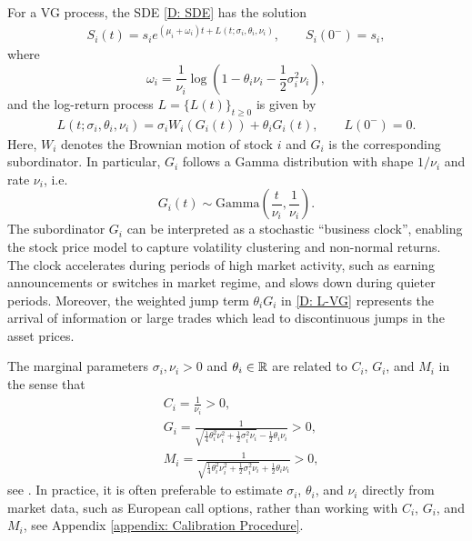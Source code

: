 For a VG process, the SDE \eqref{D: SDE} has the solution
\begin{align}
    S_i(t) = s_i e^{(\mu_i+\omega_i)t + L(t;\sigma_i, \theta_i, \nu_i)}, \qquad S_i(0^-) = s_i,
    \label{D: Stock price model}
\end{align}
where 
\begin{equation}
    \omega_i = \frac{1}{\nu_i} \log \left( 1 - \theta_i\nu_i - \frac{1}{2}\sigma_i^2 \nu_i \right),
    \label{D: omega-i}
\end{equation}
and the log-return process $L=\{L(t)\}_{t \geq 0}$ is given by
\begin{align}
    L(t;\sigma_i, \theta_i, \nu_i) = \sigma_i W_i(G_i(t)) + \theta_iG_i(t), \qquad L(0^-)=0.
    \label{D: L-VG}
\end{align}
Here, $W_i$ denotes the Brownian motion of stock $i$ and $G_i$ is the corresponding subordinator. In particular, $G_i$ follows a Gamma distribution with shape $1/\nu_i$ and rate $\nu_i$, i.e.
\begin{equation*}
    G_i(t) \sim \text{Gamma}\left(\frac{t}{\nu_i}, \frac{1}{\nu_i} \right). 
\end{equation*}
The subordinator $G_i$ can be interpreted as a stochastic ``business clock'', enabling the stock price model to capture volatility clustering and non-normal returns. The clock accelerates during periods of high market activity, such as earning announcements or switches in market regime, and slows down during quieter periods. Moreover, the weighted jump term $\theta_i G_i$ in \eqref{D: L-VG} represents the arrival of information or large trades which lead to discontinuous jumps in the asset prices.

The marginal parameters $\sigma_i, \nu_i > 0$ and $\theta_i \in \mathbb{R}$ are related to $C_i$, $G_i$, and $M_i$ in the sense that
\begin{align*}
    & C_i = \frac{1}{\nu_i} > 0, \\
    & G_i = \frac{1}{\sqrt{\frac{1}{4} \theta_i^2 \nu_i^2 + \frac{1}{2}\sigma_i^2\nu_i} - \frac{1}{2}\theta_i\nu_i} > 0, \\
    & M_i = \frac{1}{\sqrt{\frac{1}{4} \theta_i^2 \nu_i^2 + \frac{1}{2}\sigma_i^2\nu_i} + \frac{1}{2}\theta_i\nu_i} > 0,
\end{align*}
see \cite[Chapter 5.3.7]{schoutens2003levy}. In practice, it is often preferable to estimate $\sigma_i$, $\theta_i$, and $\nu_i$ directly from market data, such as European call options, rather than working with $C_i$, $G_i$, and $M_i$, see Appendix \ref{appendix: Calibration Procedure}.

